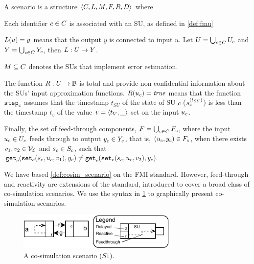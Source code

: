 \begin{definition}[Scenario]\label{def:cosim_scenario}
  A scenario is a structure $ \left\langle C, L, M, F, R, D \right\rangle $ where 
  \begin{compactitem}
    \item Each identifier $c \in C$ is associated with an SU, as defined in \cref{def:fmu}
    \item $L(u)=y$ means that the output $y$ is connected to input $u$.   
    Let $U = \bigcup_{c \in C} U_{c}$ and $Y = \bigcup_{c \in C} Y_{c}$, then $L : U \to Y$. 
    \item $M \subseteq C$ denotes the SUs that implement error estimation. 
    \item The function
    $R : U \to \mathbb{B}$ is total and provide non-confidential information about the SUs' input approximation functions.
    $R(u_{c}) = \mathit{true}$ means that the function $\mathtt{step}_{c}$ assumes that the timestamp $t_{SU}$ of the state of SU $c$ ($s_{c}^{(t_{SU})}$) is less than the timestamp $t_v$ of the value $v =  \left\langle t_V,\_ \right\rangle $ set on the input $u_{c}$.
    \item  Finally, the set of feed-through components, $F = \bigcup_{c \in C} F_{c}$, where the input $u_{c} \in U_{c}$ feeds through to output $y_{c} \in Y_{c}$, that is, $(u_{c},y_{c}) \in F_{c}$, when there exists $v_1, v_2 \in \mathcal{V_{E}}$ and $s_{c} \in S_{c}$, such that
    $\mathtt{get}_{c} (\mathtt{set}_{c}(s_{c}, u_{c}, v_1), y_{c}) \neq \mathtt{get}_{c} (\mathtt{set}_{c}(s_{c}, u_{c}, v_2), y_{c}).$
  \end{compactitem}
\end{definition}

We have based \cref{def:cosim_scenario} on the FMI standard. 
However, feed-through and reactivity are extensions of the standard, introduced to cover a broad class of co-simulation scenarios.
We use the syntax in \cref{fig:simpleexample} to graphically present co-simulation scenarios.

\begin{figure}[htb]
  \centering
  \includegraphics[width=0.7\textwidth]{images/simple_example.pdf}
  \caption{A co-simulation scenario ($S1$).}
  \label{fig:simpleexample}  
\end{figure}

